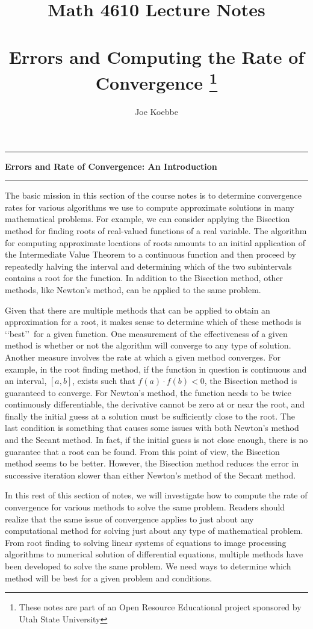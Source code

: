 \documentclass[10pt,fleqn]{article}
\title{Math 4610 Lecture Notes \\
            \ \\
        Errors and Computing the Rate of Convergence
  \footnote{These notes are part of an Open Resource Educational project
            sponsored by Utah State University}}
\author{Joe Koebbe}
\begin{document}
\maketitle
\newpage

\vskip0.1in\hrule\vskip0.1in
\noindent
{\bf Errors and Rate of Convergence: An Introduction}
\vskip0.1in\hrule\vskip0.1in
\noindent
The basic mission in this section of the course notes is to determine
convergence rates for various algorithms we use to compute approximate solutions
in many mathematical problems. For example, we can consider applying the
Bisection method for finding roots of real-valued functions of a real variable.
The algorithm for computing approximate locations of roots amounts to an initial
application of the Intermediate Value Theorem to a continuous function and then
proceed by repeatedly halving the interval and determining which of the two
subintervals contains a root for the function. In addition to the Bisection
method, other methods, like Newton's method, can be applied to the same problem.

Given that there are multiple methods that can be applied to obtain an 
approximation for a root, it makes sense to determine which of these methods
is \lq\lq best\rq\rq\ for a given function. One measurement of the effectiveness
of a given method is whether or not the algorithm will converge to any type of
solution. Another measure involves the rate at which a given method converges.
For example, in the root finding method, if the function in question is
continuous and an interval, $[a, b]$, exists such that $f(a)\cdot f(b)<0$, the
Bisection method is guaranteed to converge. For Newton's method, the function
needs to be twice continuously differentiable, the derivative cannot be zero at
or near the root, and finally the initial guess at a solution must be
sufficiently close to the root. The last condition is something that causes
some issues with both Newton's method and the Secant method. In fact, if the
initial guess is not close enough, there is no guarantee that a root can be
found. From this point of view, the Bisection method seems to be better.
However, the Bisection method reduces the error in successive iteration slower
than either Newton's method of the Secant method.

In this rest of this section of notes, we will investigate how to compute the
rate of convergence for various methods to solve the same problem. Readers
should realize that the same issue of convergence applies to just about any
computational method for solving just about any type of mathematical problem.
From root finding to solving linear systems of equations to image processing
algorithms to numerical solution of differential equations, multiple methods
have been developed to solve the same problem. We need ways to determine which
method will be best for a given problem and conditions.
\end{document}
